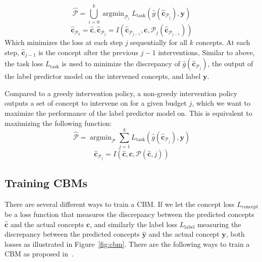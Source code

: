 \documentclass[../main.tex]{subfiles}
\begin{document}
\[\hat{\mathcal{P}} = \bigcup_{i=0}^k \mathop{\mathrm{argmin}}_{\mathcal{P}_i} L_{\text{task}}(\hat{g}(\hat{\mathbf{c}}_{\mathcal{P}_j}), \mathbf{y}) \]
\[\hat{\mathbf{c}}_{\mathcal{P}_0} = \hat{\mathbf{c}}, \hat{\mathbf{c}}_{\mathcal{P}_j} = I(\hat{\mathbf{c}}_{\mathcal{P}_{j-1}}, \mathbf{c}, \mathcal{P}_j(\hat{\mathbf{c}}_{\mathcal{P}_{j-1}}))\]
Which minimizes the loss at each step $j$ sequentially
for all $k$ concepts. At each
step, $\hat{\mathbf{c}}_{j-1}$ is 
the concept after the previous $j-1$ interventions,
Similar to above, the task loss $L_{\text{task}}$ is used to minimize
the discrepancy of $\hat{g}(\hat{\mathbf{c}}_{\mathcal{P}_j})$, 
the output of the label predictor model on the intervened concepts,
and label $\mathbf{y}$.

Compared to a greedy intervention policy, a non-greedy intervention 
policy outputs a set of concept to intervene on for a given budget $j$,
which we want to maximize the performance of the 
label predictor model on. This is equivalent to maximizing the following 
function:
\[\hat{\mathcal{P}} = \mathop{\mathrm{argmin}}_{\mathcal{P}} \sum_{j=1}^k L_{\text{task}}(\hat{g}(\hat{\mathbf{c}}_{\mathcal{P}_j}), \mathbf{y}) \]
\[\hat{\mathbf{c}}_{\mathcal{P}_j} = I(\hat{\mathbf{c}}, \mathbf{c}, \mathcal{P}(\hat{\mathbf{c}}, j))\]

\subsection{Training CBMs}

There are several different ways to train a CBM. 
If we let the concept loss $L_{\text{concept}}$ be a loss
 function that measures
the discrepancy between the predicted concepts $\hat{\mathbf{c}}$
and the actual concepts $\mathbf{c}$, and similarly the 
label loss $L_{\text{label}}$ measuring the discrepancy
between the predicted concepts $\hat{\mathbf{y}}$
and the actual concept $\mathbf{y}$,
both losses as illustrated in Figure~\ref{fig:cbm}.
There are the following ways
to train a CBM as proposed in~\cite{cbm}.
\end{document}
